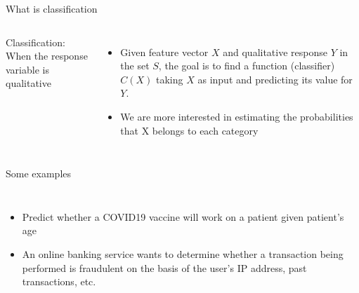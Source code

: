 \documentclass[aspectratio=169,usenames,dvipsnames]{beamer}
\newcommand{\InstructorNotes}[1]{\textit{\color{orange}#1}}
\newcommand{\InstructorList}[1]{
\begin{itemize}
	\color{orange}
	#1
\end{itemize}
}
\renewcommand{\InstructorNotes}[1]{}
\renewcommand{\InstructorList}[1]{}
\begin{document}
\begin{frame}[t]{What is classification }

\begin{columns}
Classification: When the response variable is qualitative

\InstructorList{
\item qualitative: Unordered set
\item Examples
\InstructorList{
\item Eye color $\in \{ brown, blue, green\}$
\item $email \in \{ spam, not spam\}$
}
}
\begin{itemize}
	\item
Given feature vector $X$ and qualitative response $Y$ in the set $S$, the goal is to find a function (classifier) $C(X)$ taking $X$ as input and predicting its value for $Y$.

	\item
We are more interested in estimating the probabilities that X belongs to each category
\end{itemize}
\end{columns}

\end{frame}
\begin{frame}[c]{Some examples }

\InstructorNotes{Discuss what set $Y$ comes from in each case }

\begin{columns}
\centering
\begin{itemize}
	\item Predict whether a COVID19 vaccine will work on a patient given patient's age
	\item An online banking service wants to determine whether a transaction being performed is fraudulent on the basis of the user's IP address, past transactions, etc.

\end{itemize}
\centering

\end{columns}

\end{frame}

\end{document}
